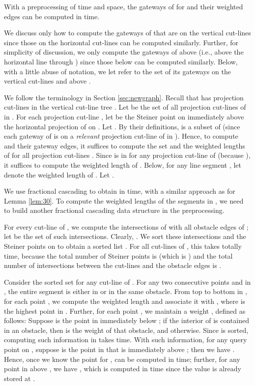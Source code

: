 \documentclass[english,runningheads,11pt]{llncs}
\newenvironment{proof}{\noindent {\textbf{Proof:}}\rm}{\hfill \rm}
\begin{document}
\begin{lemma}\label{lem:210}
With a preprocessing of  time and  space,
the gateways of  for  and their weighted edges
can be computed in  time.
\end{lemma}
\begin{proof}
We discuss only how to
compute the gateways of  that are on the vertical cut-lines
since those on the horizontal cut-lines can be computed similarly.
Further, for simplicity of discussion, we only compute the gateways of
 above  (i.e., above the horizontal line through ) since those
below  can be computed similarly.
Below, with a little abuse of notation, we let  refer to the
set of its gateways on the vertical cut-lines and above .



We follow the terminology in Section \ref{sec:newgraph}.
Recall that  has  projection cut-lines in the vertical cut-line tree .
Let  be the set of all projection cut-lines of  in .
For each projection cut-line , let  be the Steiner
point on  immediately above the horizontal projection  of  on .
Let . By their definitions,
 is a subset of  (since each gateway of 
is on a {\it relevant} projection cut-line of  in ).
Hence, to compute  and their gateway
edges, it suffices to compute the set  and the weighted lengths of
 for all projection cut-lines .
Since  is in
 for any projection cut-line  of  \cite{ref:ChenSh00} (because ), it suffices to compute the weighted length of
. Below, for any line segment , let 
denote the weighted length of . Let .

We use fractional cascading \cite{ref:ChazelleFr86}
to obtain  in  time,
with a similar approach as for Lemma \ref{lem:30}.
To compute the weighted lengths of the segments in , we need to build another fractional
cascading data structure in the preprocessing.

For every cut-line  of , we compute the intersections of  with all
obstacle edges of ; let  be the set of such intersections.
Clearly, . We sort these intersections and the Steiner points on  to obtain a
sorted list . For all  cut-lines of ,
this takes totally  time,
because the total number of Steiner points is  (which is ) and the total number of
intersections between the cut-lines and the obstacle edges is .

Consider the sorted set  for any cut-line  of . For
any two consecutive points  and  in , the entire segment
 is either in  or in the same
obstacle. From top to bottom in , for each point ,
we compute the weighted length  and associate it with
, where  is the highest point in .  Further, for each point ,
we maintain a weight , defined as follows: Suppose  is the point in
 immediately below ; if the interior of  is
contained in an obstacle, then  is the weight of that obstacle, and
 otherwise.
Since  is sorted, computing such information in  takes  time.
With such information, for any query point
 on , suppose  is the point in  that is
immediately above ; then we have
.
Hence, once we know the point  for ,
  can be computed in  time; further,
for any point  in  above , we have , which
is computed in  time since the value  is already stored at .


\end{proof}
\end{document}
